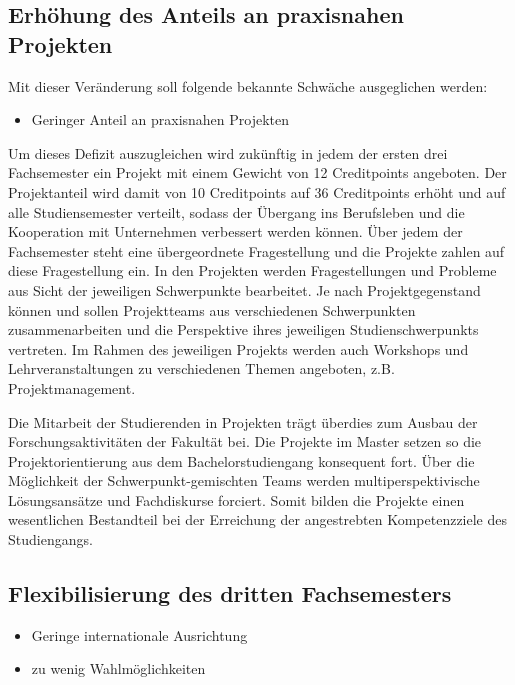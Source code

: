 \subsection{Erhöhung des Anteils an praxisnahen
Projekten}\label{erhuxf6hung-des-anteils-an-praxisnahen-projekten}

Mit dieser Veränderung soll folgende bekannte Schwäche ausgeglichen
werden:

\begin{itemize}
\tightlist
\item
  Geringer Anteil an praxisnahen Projekten
\end{itemize}

Um dieses Defizit auszugleichen wird zukünftig in jedem der ersten drei
Fachsemester ein Projekt mit einem Gewicht von 12 Creditpoints
angeboten. Der Projektanteil wird damit von 10 Creditpoints auf 36
Creditpoints erhöht und auf alle Studiensemester verteilt, sodass der
Übergang ins Berufsleben und die Kooperation mit Unternehmen verbessert
werden können. Über jedem der Fachsemester steht eine übergeordnete
Fragestellung und die Projekte zahlen auf diese Fragestellung ein. In
den Projekten werden Fragestellungen und Probleme aus Sicht der
jeweiligen Schwerpunkte bearbeitet. Je nach Projektgegenstand können und
sollen Projektteams aus verschiedenen Schwerpunkten zusammenarbeiten und
die Perspektive ihres jeweiligen Studienschwerpunkts vertreten. Im
Rahmen des jeweiligen Projekts werden auch Workshops und
Lehrveranstaltungen zu verschiedenen Themen angeboten, z.B.
Projektmanagement.

Die Mitarbeit der Studierenden in Projekten trägt überdies zum Ausbau
der Forschungsaktivitäten der Fakultät bei. Die Projekte im Master
setzen so die Projektorientierung aus dem Bachelorstudiengang konsequent
fort. Über die Möglichkeit der Schwerpunkt-gemischten Teams werden
multiperspektivische Lösungsansätze und Fachdiskurse forciert. Somit
bilden die Projekte einen wesentlichen Bestandteil bei der Erreichung
der angestrebten Kompetenzziele des Studiengangs.

\subsection{Flexibilisierung des dritten
Fachsemesters}\label{flexibilisierung-des-dritten-fachsemesters}

\begin{itemize}
\tightlist
\item
  Geringe internationale Ausrichtung
\item
  zu wenig Wahlmöglichkeiten
\end{itemize}

